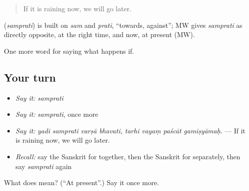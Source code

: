 \begin{quote}
If it is raining now, we will go later.
\end{quote}

\begin{cousinweb}
\textbf{} (\emph{samprati}) is built on \emph{sam} and \emph{prati}, \textquotedblleft{}towards, against\textquotedblright{}; MW gives \emph{samprati} as directly opposite, at the right time, and now, at present (MW).
\end{cousinweb}

\begin{grammarlens}[title={What you've built}]
One more word for saying what happens if.
\end{grammarlens}

\subsection*{Your turn}
\begin{itemize}
\raggedright
  \item \emph{Say it:} \emph{samprati}
  \item \emph{Say it:} \emph{samprati}, once more
  \item \emph{Say it:} \emph{yadi samprati varṣā bhavati, tarhi vayaṃ paścāt gamiṣyāmaḥ.} — If it is raining now, we will go later.
  \item \emph{Recall:} say the Sanskrit for together, then the Sanskrit for separately, then say \emph{samprati} again
\end{itemize}

\begin{tcolorbox}[breakable,colback=teal!4,colframe=teal!35!black,title={Before you move on}]
What does  mean? (\textquotedblleft{}At present\textquotedblright{}.) Say it once more.
\end{tcolorbox}
